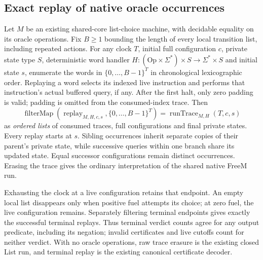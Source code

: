 \begin{result}
\subsection{Exact replay of native oracle occurrences}
Let $M$ be an existing shared-core list-choice machine, with decidable equality
on its oracle operations. Fix $B\ge 1$ bounding the length of every local
transition list, including repeated actions. For any clock $T$, initial full
configuration $c$, private state type $S$, deterministic word handler
$H:(\mathrm{Op}\times\Sigma^*)\times S\to\Sigma^*\times S$ and initial state $s$,
enumerate the words in $\{0,\ldots,B-1\}^T$ in chronological lexicographic order.
Replaying a word selects its indexed live instruction and performs that
instruction's actual buffered query, if any. After the first halt, only zero
padding is valid; padding is omitted from the consumed-index trace. Then
\[
 \operatorname{filterMap}(\operatorname{replay}_{M,H,c,s},\{0,\ldots,B-1\}^T)
 =\operatorname{runTrace}_{M,H}(T,c,s)
\]
as \emph{ordered lists} of consumed traces, full configurations and final private
states. Every replay starts at $s$. Sibling occurrences inherit separate copies
of their parent's private state, while successive queries within one branch
share its updated state. Equal successor configurations remain distinct
occurrences. Erasing the trace gives the ordinary interpretation of the shared
native FreeM run.

Exhausting the clock at a live configuration retains that endpoint. An empty
local list disappears only when positive fuel attempts its choice; at zero fuel,
the live configuration remains. Separately filtering terminal endpoints gives
exactly the successful terminal replays. Thus terminal verdict counts agree for
any output predicate, including its negation; invalid certificates and live
cutoffs count for neither verdict. With no oracle operations, raw trace erasure
is the existing closed List run, and terminal replay is the existing canonical
certificate decoder.


\end{result}
